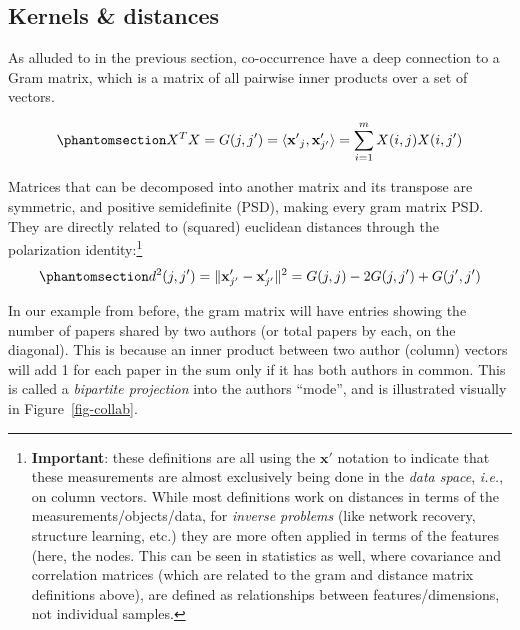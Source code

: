 \documentclass[%
	12pt,
		oneside,
		letterpaper
]{book}
\begin{document}
\subsection{Kernels \& distances}\label{kernels-distances}

As alluded to in the previous section, co-occurrence have a deep
connection to a Gram matrix, which is a matrix of all pairwise inner
products over a set of vectors.

\begin{equation}\phantomsection\label{eq-gram-mat}{
X^TX=G(j,j')=\langle\mathbf{x'}_j,\mathbf{x}_{j'}'\rangle = \sum_{i=1}^{m} X(i,j)X(i,j')
}\end{equation}

Matrices that can be decomposed into another matrix and its transpose
are symmetric, and positive semidefinite (PSD), making every gram matrix
PSD. They are directly related to (squared) euclidean distances through
the polarization identity:\footnote{\textbf{Important}: these
  definitions are all using the \(\mathbf{x}'\) notation to indicate
  that these measurements are almost exclusively being done in the
  \emph{data space}, \emph{i.e.}, on column vectors. While most
  definitions work on distances in terms of the
  measurements/objects/data, for \emph{inverse problems} (like network
  recovery, structure learning, etc.) they are more often applied in
  terms of the features (here, the nodes. This can be seen in statistics
  as well, where covariance and correlation matrices (which are related
  to the gram and distance matrix definitions above), are defined as
  relationships between features/dimensions, not individual samples.}
\begin{equation}\phantomsection\label{eq-sq-distance}{
d^2(j,j') = \|\mathbf{x}_{j'}'-\mathbf{x}_{j'}'\|^2 = G(j,j) - 2G(j,j') + G(j',j') 
}\end{equation}

In our example from before, the gram matrix will have entries showing
the number of papers shared by two authors (or total papers by each, on
the diagonal). This is because an inner product between two author
(column) vectors will add 1 for each paper in the sum only if it has
both authors in common. This is called a \emph{bipartite
projection}\autocite{Bipartitenetworkprojection_Zhou2007,atlasaspiringnetwork_Coscia2021}
into the authors ``mode'', and is illustrated visually in
Figure~\ref{fig-collab}.
\end{document}
